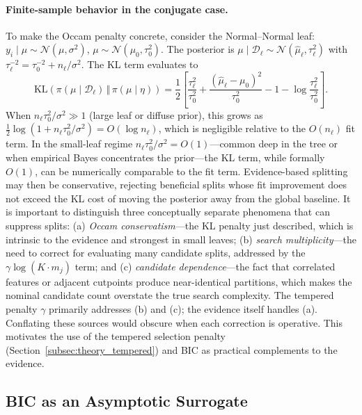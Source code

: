\documentclass[twoside,11pt]{article}
\begin{document}
\paragraph{Finite-sample behavior in the conjugate case.}
To make the Occam penalty concrete, consider the Normal--Normal leaf: $y_i \mid \mu \sim \mathcal{N}(\mu, \sigma^2)$, $\mu \sim \mathcal{N}(\mu_0, \tau_0^2)$. The posterior is $\mu \mid \mathcal{D}_\ell \sim \mathcal{N}(\hat{\mu}_\ell, \tau_\ell^2)$ with $\tau_\ell^{-2} = \tau_0^{-2} + n_\ell / \sigma^2$. The KL term evaluates to
\begin{equation}\label{eq:kl_normal}
\mathrm{KL}\!\left(\pi(\mu\mid \mathcal{D}_\ell)\,\Vert\,\pi(\mu\mid\eta)\right)
=
\frac{1}{2}\left[\frac{\tau_\ell^2}{\tau_0^2} + \frac{(\hat{\mu}_\ell - \mu_0)^2}{\tau_0^2} - 1 - \log\frac{\tau_\ell^2}{\tau_0^2}\right].
\end{equation}
When $n_\ell \tau_0^2 / \sigma^2 \gg 1$ (large leaf or diffuse prior), this grows as $\frac{1}{2}\log(1 + n_\ell\tau_0^2/\sigma^2) = O(\log n_\ell)$, which is negligible relative to the $O(n_\ell)$ fit term. In the small-leaf regime $n_\ell \tau_0^2/\sigma^2 = O(1)$---common deep in the tree or when empirical Bayes concentrates the prior---the KL term, while formally $O(1)$, can be numerically comparable to the fit term. Evidence-based splitting may then be conservative, rejecting beneficial splits whose fit improvement does not exceed the KL cost of moving the posterior away from the global baseline. It is important to distinguish three conceptually separate phenomena that can suppress splits: (a) \emph{Occam conservatism}---the KL penalty just described, which is intrinsic to the evidence and strongest in small leaves; (b) \emph{search multiplicity}---the need to correct for evaluating many candidate splits, addressed by the $\gamma\log(K \cdot m_j)$ term; and (c) \emph{candidate dependence}---the fact that correlated features or adjacent cutpoints produce near-identical partitions, which makes the nominal candidate count overstate the true search complexity. The tempered penalty $\gamma$ primarily addresses (b) and (c); the evidence itself handles (a). Conflating these sources would obscure when each correction is operative. This motivates the use of the tempered selection penalty (Section~\ref{subsec:theory_tempered}) and BIC as practical complements to the evidence.


\subsection{BIC as an Asymptotic Surrogate}\label{subsec:theory_surrogates}
\end{document}
